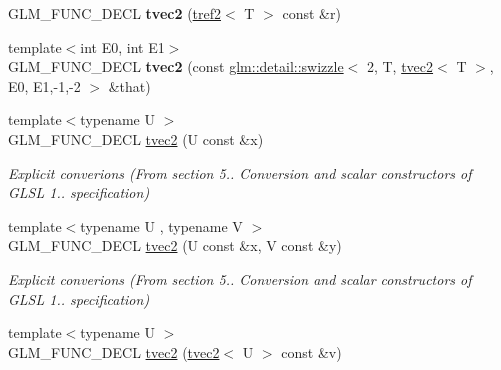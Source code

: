\begin{DoxyCompactItemize}
\item 
\hypertarget{structglm_1_1detail_1_1tvec2_a343fdf7daa477b63a88aab1a61c1d83a}{}G\+L\+M\+\_\+\+F\+U\+N\+C\+\_\+\+D\+E\+C\+L {\bfseries tvec2} (\hyperlink{structglm_1_1detail_1_1tref2}{tref2}$<$ T $>$ const \&r)\label{structglm_1_1detail_1_1tvec2_a343fdf7daa477b63a88aab1a61c1d83a}

\item 
\hypertarget{structglm_1_1detail_1_1tvec2_add0938d9c87c7a301ee3f49d8a0b4eb5}{}{\footnotesize template$<$int E0, int E1$>$ }\\G\+L\+M\+\_\+\+F\+U\+N\+C\+\_\+\+D\+E\+C\+L {\bfseries tvec2} (const \hyperlink{structglm_1_1detail_1_1swizzle}{glm\+::detail\+::swizzle}$<$ 2, T, \hyperlink{structglm_1_1detail_1_1tvec2}{tvec2}$<$ T $>$, E0, E1,-\/1,-\/2 $>$ \&that)\label{structglm_1_1detail_1_1tvec2_add0938d9c87c7a301ee3f49d8a0b4eb5}

\item 
\hypertarget{structglm_1_1detail_1_1tvec2_a877ab37ed04a0e66ae553a13d0c3d820}{}{\footnotesize template$<$typename U $>$ }\\G\+L\+M\+\_\+\+F\+U\+N\+C\+\_\+\+D\+E\+C\+L \hyperlink{structglm_1_1detail_1_1tvec2_a877ab37ed04a0e66ae553a13d0c3d820}{tvec2} (U const \&x)\label{structglm_1_1detail_1_1tvec2_a877ab37ed04a0e66ae553a13d0c3d820}

\begin{DoxyCompactList}\small\item\em Explicit converions (From section 5.. Conversion and scalar constructors of G\+L\+S\+L 1.. specification) \end{DoxyCompactList}\item 
\hypertarget{structglm_1_1detail_1_1tvec2_a074ee042e18f4a7ec3d40f1f2b96d94e}{}{\footnotesize template$<$typename U , typename V $>$ }\\G\+L\+M\+\_\+\+F\+U\+N\+C\+\_\+\+D\+E\+C\+L \hyperlink{structglm_1_1detail_1_1tvec2_a074ee042e18f4a7ec3d40f1f2b96d94e}{tvec2} (U const \&x, V const \&y)\label{structglm_1_1detail_1_1tvec2_a074ee042e18f4a7ec3d40f1f2b96d94e}

\begin{DoxyCompactList}\small\item\em Explicit converions (From section 5.. Conversion and scalar constructors of G\+L\+S\+L 1.. specification) \end{DoxyCompactList}\item 
\hypertarget{structglm_1_1detail_1_1tvec2_ac606857971b3d9ffcb9991647dc556c3}{}{\footnotesize template$<$typename U $>$ }\\G\+L\+M\+\_\+\+F\+U\+N\+C\+\_\+\+D\+E\+C\+L \hyperlink{structglm_1_1detail_1_1tvec2_ac606857971b3d9ffcb9991647dc556c3}{tvec2} (\hyperlink{structglm_1_1detail_1_1tvec2}{tvec2}$<$ U $>$ const \&v)\label{structglm_1_1detail_1_1tvec2_ac606857971b3d9ffcb9991647dc556c3}


\end{DoxyCompactItemize}
